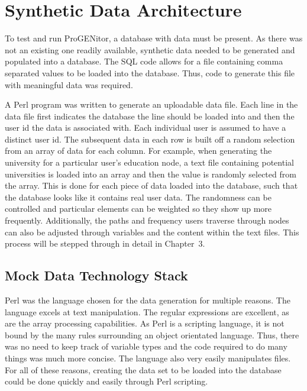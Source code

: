 \section{Synthetic Data Architecture}
	To test and run ProGENitor, a database with data must be present.  As there was
not an existing one readily available, synthetic data needed to be generated and
populated into a database.  The SQL code allows for a file containing comma
separated values to be loaded into the database.  Thus, code to generate this
file with meaningful data was required.  
	
A Perl program was written to generate an uploadable data file.  Each line in
the data file first indicates the database the line should be loaded into and
then the user id the data is associated with.  Each individual user is assumed
to have a distinct user id.  The subsequent data in each row is built off a
random selection from an array of data for each column.  For example, when
generating the university for a particular user's education node, a text file
containing potential universities is loaded into an array and then the value is
randomly selected from the array.  This is done for each piece of data loaded
into the database, such  that the database looks like it contains real user
data.  The randomness can be controlled and particular elements can be weighted
so they show up more frequently.  Additionally, the paths and frequency users
traverse through nodes can also be adjusted through variables and the content
within the text files.  This process will be stepped through in detail in
Chapter~3.

\subsection{Mock Data Technology Stack}
Perl was the language chosen for the data generation for multiple reasons.  The
language excels at text manipulation.  The regular expressions are excellent, as
are the array processing capabilities.  As Perl is a scripting language, it is
not bound by the many rules surrounding an object orientated language.  Thus,
there was no need to keep track of variable types and the code required to do
many things was much more concise.  The language also very easily manipulates
files.  For all of these reasons, creating the data set to be loaded into the
database could be done quickly and easily through Perl scripting.
